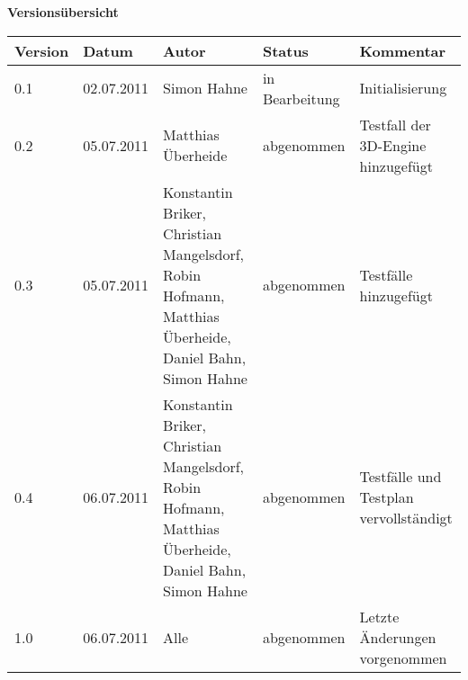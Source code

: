 
{\textbf{Versionsübersicht}}\\[2ex]

\begin{longtable}{|m{1.78cm}|m{1.59cm}|m{2.86cm}|m{1.9cm}|m{5.25cm}|}

  \hline                                              %

  \textbf{Version}  &    \textbf{Datum}  &    \textbf{Autor}  &
  \textbf{Status}   &    \textbf{Kommentar}  \\       %
  \hline                                              %

  0.1  &   02.07.2011  & Simon Hahne    &   in Bearbeitung    &    Initialisierung\\       %
  \hline
	0.2  & 05.07.2011   &  Matthias Überheide  &   abgenommen    &  Testfall der 3D-Engine hinzugefügt\\       %
  \hline   
	0.3  &  05.07.2011   & Konstantin Briker, Christian Mangelsdorf, Robin Hofmann, Matthias Überheide, Daniel Bahn, Simon Hahne  &    abgenommen    &  Testfälle hinzugefügt \\       %
  \hline   
	0.4  &   06.07.2011 & Konstantin Briker, Christian Mangelsdorf, Robin Hofmann, Matthias Überheide, Daniel Bahn, Simon Hahne  &   abgenommen    &  Testfälle und Testplan vervollständigt  \\       %
  \hline   
	1.0  &  06.07.2011   & Alle &   abgenommen    &  Letzte Änderungen vorgenommen  \\       %
  \hline   %

\end{longtable}


